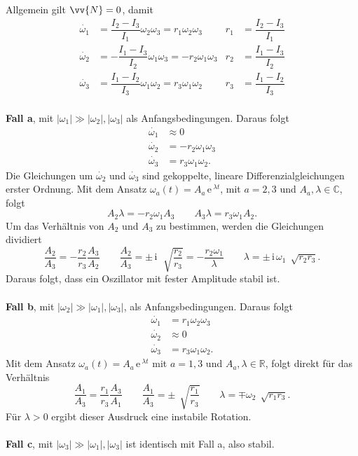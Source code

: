 \documentclass[a4paper,12pt]{article}
\numberwithin{equation}{section}
\begin{document}
Allgemein gilt $\vv{N}=0$, damit
\begin{align*}
        \dot{\omega _1}&=\dfrac{I_2-I_3}{I_1}\omega _2\omega _3=r_1\omega _2\omega _3&r_1&=\dfrac{I_2-I_3}{I_1}\\
        \dot{\omega _2}&=-\dfrac{I_1-I_3}{I_2}\omega _1\omega _3=-r_2\omega _1\omega _3&r_2&=\dfrac{I_1-I_3}{I_2}\\
        \dot{\omega _3}&=\dfrac{I_1-I_2}{I_3}\omega _1\omega _2=r_3\omega _1\omega _2&r_3&=\dfrac{I_1-I_2}{I_3}
\end{align*}
\hfill\\\textbf{Fall a}, mit $|\omega _1|\gg |\omega _2|,|\omega _3|$ als Anfangsbedingungen. Daraus folgt
\begin{align*}
        \dot{\omega _1}&\approx 0\\
        \dot{\omega _2}&=-r_2\omega _1\omega _3\\
        \dot{\omega _3}&=r_3\omega _1\omega _2
.\end{align*}
Die Gleichungen um $\dot{\omega _2}$ und $\dot{\omega _3}$ sind gekoppelte, lineare Differenzialgleichungen erster Ordnung. Mit dem Ansatz $\omega _a\left(t\right)=A_a\,\text{e}\,^{\lambda t}$, mit $a=2,3$ und $A_a,\lambda  \in \mathbb{C}$, folgt
\[ 
        A_2\lambda =-r_2\omega _1A_3\qquad A_3\lambda =r_3\omega _1A_2
.\] 
Um das Verhältnis von $A_2$ und $A_3$ zu bestimmen, werden die Gleichungen dividiert
\[ 
        \dfrac{A_2}{A_3}=-\dfrac{r_2}{r_3}\dfrac{A_3}{A_2}\qquad \dfrac{A_2}{A_3}=\pm \,\text{i}\,\,\sqrt[]{\dfrac{r_2}{r_3}}=-\dfrac{r_2\omega _1}{\lambda }\qquad \lambda =\pm \,\text{i}\,\omega _1\,\sqrt[]{r_2r_3}
.\] 
Daraus folgt, dass ein Oszillator mit fester Amplitude stabil ist.
\\\hfill\\\textbf{Fall b}, mit $|\omega _2|\gg |\omega _1|,|\omega _3|$, als Anfangsbedingungen. Daraus folgt
\begin{align*}
        \dot{\omega _1}&=r_1\omega _2\omega _3\\
        \dot{\omega _2}&\approx 0\\
        \dot{\omega _3}&=r_3\omega _1\omega _2
.\end{align*}
Mit dem Ansatz $\omega _a\left(t\right)=A_a\,\text{e}\,^{\lambda t}$ mit $a=1,3$ und $A_a,\lambda  \in \mathbb{R}$, folgt direkt für das Verhältnis
\[ 
        \dfrac{A_1}{A_3}=\dfrac{r_1}{r_3}\dfrac{A_3}{A_1}\qquad \dfrac{A_1}{A_3}=\pm \,\sqrt[]{\dfrac{r_1}{r_3}}\qquad \lambda =\mp \omega _2\,\sqrt[]{r_1r_3}
.\] 
Für $\lambda >0$ ergibt dieser Ausdruck eine instabile Rotation.
\\\hfill\\\textbf{Fall c}, mit $|\omega _3|\gg |\omega _1|,|\omega _3|$ ist identisch mit Fall a, also stabil.
\end{document}
